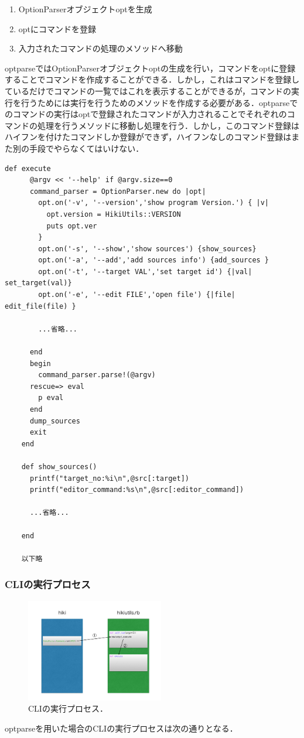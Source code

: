 \begin{enumerate}
\item OptionParserオブジェクトoptを生成
\item optにコマンドを登録
\item 入力されたコマンドの処理のメソッドへ移動
\end{enumerate}
optparseではOptionParserオブジェクトoptの生成を行い，コマンドをoptに登録することでコマンドを作成することができる．しかし，これはコマンドを登録しているだけでコマンドの一覧ではこれを表示することができるが，コマンドの実行を行うためには実行を行うためのメソッドを作成する必要がある．optparseでのコマンドの実行はoptで登録されたコマンドが入力されることでそれぞれのコマンドの処理を行うメソッドに移動し処理を行う．しかし，このコマンド登録はハイフンを付けたコマンドしか登録ができず，ハイフンなしのコマンド登録はまた別の手段でやらなくてはいけない．
\begin{lstlisting}[style=customRuby]
    def execute
      @argv << '--help' if @argv.size==0
      command_parser = OptionParser.new do |opt|
        opt.on('-v', '--version','show program Version.') { |v|
          opt.version = HikiUtils::VERSION
          puts opt.ver
        }
        opt.on('-s', '--show','show sources') {show_sources}
        opt.on('-a', '--add','add sources info') {add_sources }
        opt.on('-t', '--target VAL','set target id') {|val| set_target(val)}
        opt.on('-e', '--edit FILE','open file') {|file| edit_file(file) }

        ...省略...

      end
      begin
        command_parser.parse!(@argv)
      rescue=> eval
        p eval
      end
      dump_sources
      exit
    end    
    
    def show_sources()
      printf("target_no:%i\n",@src[:target])
      printf("editor_command:%s\n",@src[:editor_command])

      ...省略...

    end

    以下略

\end{lstlisting}
\subsubsection{CLIの実行プロセス}
\begin{figure}[htbp]\begin{center}
\includegraphics[width=6cm,bb=0 0 442 432]{../figs/./hikiutils_yamane.007.jpg}
\caption{CLIの実行プロセス．}
\label{default}\end{center}\end{figure}
optparseを用いた場合のCLIの実行プロセスは次の通りとなる．

